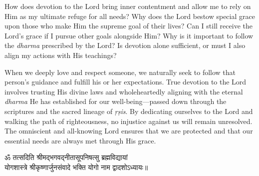 \newpage
\begin{mananam}{}
\normalfont\mananamtext How does devotion to the Lord bring inner contentment and allow me to rely on Him as my ultimate refuge for all needs? 
Why does the Lord bestow special grace upon those who make Him the supreme goal of their lives? Can I still receive the Lord’s grace if I pursue other goals alongside Him?
Why is it important to follow the \emph{dharma} prescribed by the Lord? Is devotion alone sufficient, or must I also align my actions with His teachings?
\end{mananam}
\sreflect
\begin{inspiration}{}
\normalfont\mananamtext When we deeply love and respect someone, we naturally seek to follow that person’s guidance and fulfill his or her expectations. True devotion to the Lord involves trusting His divine laws and wholeheartedly aligning with the eternal \emph{dharma} He has established for our well-being—passed down through the scriptures and the sacred lineage of \emph{ṛṣis}.
By dedicating ourselves to the Lord and walking the path of righteousness, no injustice against us will remain unresolved. The omniscient and all-knowing Lord ensures that we are protected and that our essential needs are always met through His grace. 
\end{inspiration}
\newpage

\begin{center}
\devfont ॐ तत्सदिति श्रीमद्भगवद्नीतासूपनिषत्सु  ब्रह्मविद्यायां  \\योगशास्त्रे
श्रीकृष्णार्जुनसंवादे  भक्ति योगो नाम द्वादशोऽध्यायः॥\\
\end{center}
